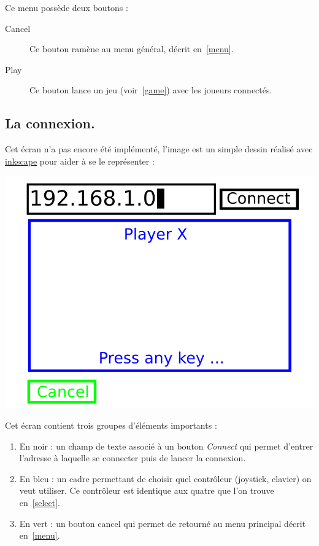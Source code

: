 \documentclass{article}
\begin{document}
Ce menu possède deux boutons :
\begin{description}
	\item[Cancel] Ce bouton ramène au menu général, décrit en~\ref{menu}.
	\item[Play] Ce bouton lance un jeu (voir~\ref{game}) avec les joueurs connectés.
\end{description}

\subsection{La connexion.} \label{connect}
Cet écran n'a pas encore été implémenté, l'image est un simple dessin réalisé avec \href{http://inkscape.org/}{inkscape} pour aider à se le représenter :
\begin{center}
	\includegraphics[scale=0.4]{img/connect.png}
\end{center}

Cet écran contient trois groupes d'éléments importants : \begin{enumerate}
	\item En noir : un champ de texte associé à un bouton \emph{Connect} qui permet d'entrer l'adresse à laquelle se connecter puis de lancer la connexion.
	\item En bleu : un cadre permettant de choisir quel contrôleur (joystick, clavier) on veut utiliser. Ce contrôleur est identique aux quatre que l'on trouve en~\ref{select}.
	\item En vert : un bouton cancel qui permet de retourné au menu principal décrit en~\ref{menu}.
\end{enumerate}
\end{document}
